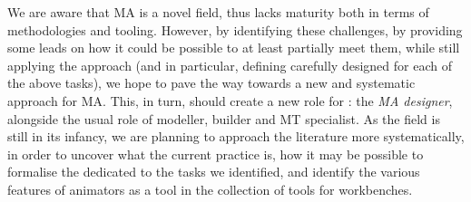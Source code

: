 We are aware that MA is a novel field, thus lacks maturity both in terms of methodologies
and tooling. However, by identifying these challenges, by providing some leads on
how it could be possible to at least partially meet them, while still applying
the \MDE approach (and in particular, defining carefully designed \DSLs for each
of the above tasks), we hope to pave the way towards a new and systematic approach
for MA. This, in turn, should create a new role for \MDE: the \emph{MA designer},
alongside the usual role of modeller, \DSL builder and MT specialist. As the field is still
in its infancy, we are planning to approach the literature more systematically,
in order to uncover what the current practice is, how it may be possible to 
formalise the \DSLs dedicated to the tasks we identified, and identify the various
features of animators as a tool in the collection of tools for \MDE workbenches.